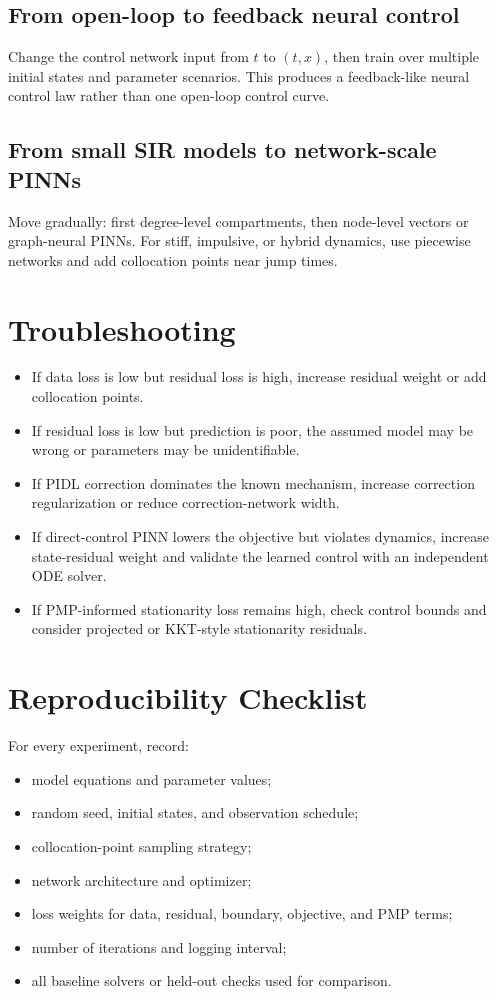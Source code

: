 \documentclass[11pt,a4paper]{article}
\begin{document}
\subsection{From open-loop to feedback neural control}
Change the control network input from \(t\) to \((t,x)\), then train over multiple initial states and parameter scenarios. This produces a feedback-like neural control law rather than one open-loop control curve.

\subsection{From small SIR models to network-scale PINNs}
Move gradually: first degree-level compartments, then node-level vectors or graph-neural PINNs. For stiff, impulsive, or hybrid dynamics, use piecewise networks and add collocation points near jump times.

\section{Troubleshooting}
\begin{itemize}
\item If data loss is low but residual loss is high, increase residual weight or add collocation points.
\item If residual loss is low but prediction is poor, the assumed model may be wrong or parameters may be unidentifiable.
\item If PIDL correction dominates the known mechanism, increase correction regularization or reduce correction-network width.
\item If direct-control PINN lowers the objective but violates dynamics, increase state-residual weight and validate the learned control with an independent ODE solver.
\item If PMP-informed stationarity loss remains high, check control bounds and consider projected or KKT-style stationarity residuals.
\end{itemize}

\section{Reproducibility Checklist}
For every experiment, record:
\begin{itemize}
\item model equations and parameter values;
\item random seed, initial states, and observation schedule;
\item collocation-point sampling strategy;
\item network architecture and optimizer;
\item loss weights for data, residual, boundary, objective, and PMP terms;
\item number of iterations and logging interval;
\item all baseline solvers or held-out checks used for comparison.
\end{itemize}
\end{document}
